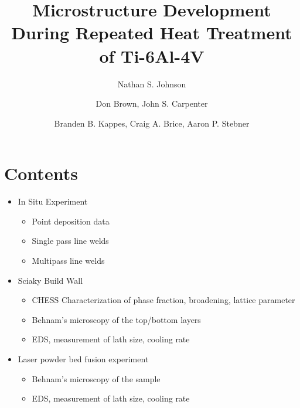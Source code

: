 \documentclass{revtex4-1}
\begin{document}
\title{Microstructure Development During Repeated Heat Treatment of Ti-6Al-4V}
\author{Nathan S. Johnson}

\author{Don Brown, John S. Carpenter}

\author{Branden B. Kappes, Craig A. Brice, Aaron P. Stebner}

\maketitle



\section{Contents}
\begin{itemize}
	\item In Situ Experiment
		\begin{itemize}
			\item Point deposition data
			\item Single pass line welds
			\item Multipass line welds
		\end{itemize}
	\item Sciaky Build Wall
		\begin{itemize}
			\item CHESS Characterization of phase fraction, broadening, lattice parameter
			\item Behnam's microscopy of the top/bottom layers
			\item EDS, measurement of lath size, cooling rate
		\end{itemize}
	\item Laser powder bed fusion experiment
		\begin{itemize}
			\item Behnam's microscopy of the sample
			\item EDS, measurement of lath size, cooling rate
		\end{itemize}
\end{itemize}

\end{document}
